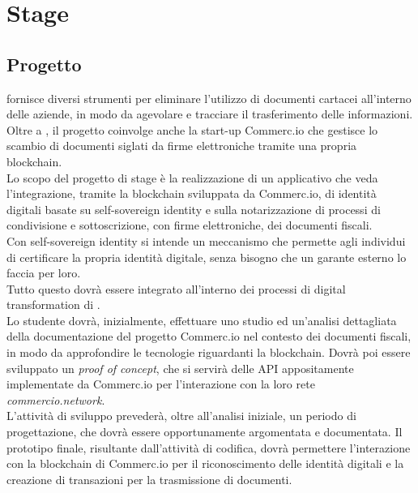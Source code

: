 
\chapter{Stage}
\label{cap:stage}


\section{Progetto}

\myCompany{} \companyTitle{} fornisce diversi strumenti per eliminare l'utilizzo di documenti cartacei all’interno delle aziende, in modo da agevolare e tracciare il trasferimento delle informazioni. Oltre a \myCompany{} \companyTitle, il progetto coinvolge anche la start-up Commerc.io che gestisce lo scambio di documenti siglati da firme elettroniche tramite una propria blockchain.
\\
Lo scopo del progetto di stage è la realizzazione di un applicativo che veda l'integrazione, tramite la blockchain sviluppata da Commerc.io, di identità digitali basate su self-sovereign identity e sulla notarizzazione di processi di condivisione e sottoscrizione, con firme elettroniche, dei documenti fiscali.
\\
Con self-sovereign identity si intende un meccanismo che permette agli individui di certificare la propria identità digitale, senza bisogno che un garante esterno lo faccia per loro.
\\
Tutto questo dovrà essere integrato all'interno dei processi di digital transformation di \myCompany{} \companyTitle.
\\
Lo studente dovrà, inizialmente, effettuare uno studio ed un'analisi dettagliata della documentazione del progetto Commerc.io nel contesto dei documenti fiscali, in modo da approfondire le tecnologie riguardanti la blockchain. Dovrà poi essere sviluppato un \textit{proof of concept}, che si servirà delle API appositamente implementate da Commerc.io per l'interazione con la loro rete \textit{commercio.network}.
\\
L'attività di sviluppo prevederà, oltre all'analisi iniziale, un periodo di progettazione, che dovrà essere opportunamente argomentata e documentata. Il prototipo finale, risultante dall'attività di codifica, dovrà permettere l'interazione con la blockchain di Commerc.io per il riconoscimento delle identità digitali e la creazione di transazioni per la trasmissione di documenti.
